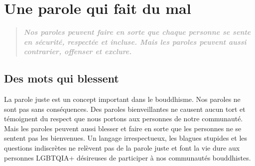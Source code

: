 \documentclass[12pt,openany]{book}
\begin{document}
\chapter*{Une parole qui fait du mal}

\begin{figure}[h]
    \centering
\end{figure}

\begingroup
\addtolength\leftmargin{-0.5in}
\begin{quote}
\centering
\doublespacing
\textit{\Large \textbf{\textcolor{darkgray}{Nos paroles peuvent faire en sorte que chaque personne se sente en sécurité, respectée et incluse. Mais les paroles peuvent aussi contrarier, offenser et exclure.}}}
\end{quote}
\endgroup

\section*{Des mots qui blessent}

\noindent La parole juste est un concept important dans le bouddhisme. Nos paroles ne sont pas sans conséquences. Des paroles bienveillantes ne causent aucun tort et témoignent du respect que nous portons aux personnes de notre communauté. Mais les paroles peuvent aussi blesser et faire en sorte que les personnes ne se sentent pas les bienvenues. Un langage irrespectueux, les blagues stupides et les questions indiscrètes ne relèvent pas de la parole juste et font la vie dure aux personnes \mbox{LGBTQIA+} désireuses de participer à nos communautés bouddhistes.
\end{document}
